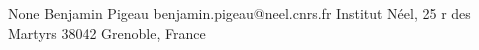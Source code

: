 \begin{conf-abstract}[]
{None}
{\color{blue} Benjamin Pigeau}
{benjamin.pigeau@neel.cnrs.fr}
{Institut Néel, 25 r des Martyrs 38042 Grenoble, France}
{\decofourleft \decofourright}





\printbibliography[heading=none]

\end{conf-abstract}
